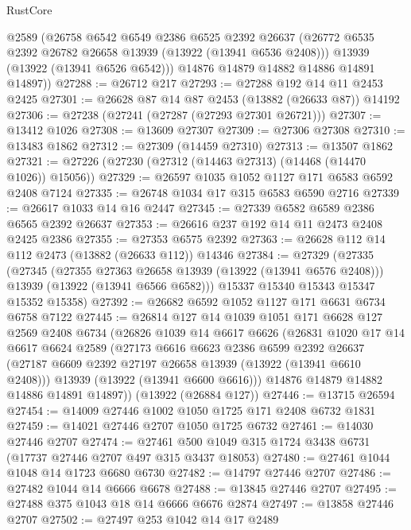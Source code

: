 \begin{lexlean}{RustCore}
\begin{coremodule}
        @2589
        (@26758
          @6542
          @6549
          @2386
          @6525
          @2392
          @26637
          (@26772 @6535 @2392 @26782 @26658 @13939 (@13922 (@13941 @6536 @2408)))
          @13939
          (@13922 (@13941 @6526 @6542)))
        @14876
        @14879
        @14882
        @14886
        @14891
        @14897))
@27288 := @26712 @217
@27293 := @27288 @192 @14 @11 @2453 @2425
@27301 := @26628 @87 @14 @87 @2453 (@13882 (@26633 @87)) @14192
@27306 := @27238 (@27241 (@27287 (@27293 @27301 @26721)))
@27307 := @13412 @1026
@27308 := @13609 @27307
@27309 := @27306 @27308
@27310 := @13483 @1862
@27312 := @27309 (@14459 @27310)
@27313 := @13507 @1862
@27321 := @27226 (@27230 (@27312 (@14463 @27313) (@14468 (@14470 @1026)) @15056))
@27329 := @26597 @1035 @1052 @1127 @171 @6583 @6592 @2408 @7124
@27335 := @26748 @1034 @17 @315 @6583 @6590 @2716
@27339 := @26617 @1033 @14 @16 @2447
@27345 := @27339 @6582 @6589 @2386 @6565 @2392 @26637
@27353 := @26616 @237 @192 @14 @11 @2473 @2408 @2425 @2386
@27355 := @27353 @6575 @2392
@27363 := @26628 @112 @14 @112 @2473 (@13882 (@26633 @112)) @14346
@27384 := @27329
    (@27335
      (@27345
        (@27355 @27363 @26658 @13939 (@13922 (@13941 @6576 @2408)))
        @13939
        (@13922 (@13941 @6566 @6582)))
      @15337
      @15340
      @15343
      @15347
      @15352
      @15358)
@27392 := @26682 @6592 @1052 @1127 @171 @6631 @6734 @6758 @7122
@27445 := @26814
    @127
    @14
    @1039
    @1051
    @171
    @6628
    @127
    @2569
    @2408
    @6734
    (@26826
      @1039
      @14
      @6617
      @6626
      (@26831
        @1020
        @17
        @14
        @6617
        @6624
        @2589
        (@27173
          @6616
          @6623
          @2386
          @6599
          @2392
          @26637
          (@27187 @6609 @2392 @27197 @26658 @13939 (@13922 (@13941 @6610 @2408)))
          @13939
          (@13922 (@13941 @6600 @6616)))
        @14876
        @14879
        @14882
        @14886
        @14891
        @14897))
    (@13922 (@26884 @127))
@27446 := @13715 @26594
@27454 := @14009 @27446 @1002 @1050 @1725 @171 @2408 @6732 @1831
@27459 := @14021 @27446 @2707 @1050 @1725 @6732
@27461 := @14030 @27446 @2707
@27474 := @27461 @500 @1049 @315 @1724 @3438 @6731 (@17737 @27446 @2707 @497 @315 @3437 @18053)
@27480 := @27461 @1044 @1048 @14 @1723 @6680 @6730
@27482 := @14797 @27446 @2707
@27486 := @27482 @1044 @14 @6666 @6678
@27488 := @13845 @27446 @2707
@27495 := @27488 @375 @1043 @18 @14 @6666 @6676 @2874
@27497 := @13858 @27446 @2707
@27502 := @27497 @253 @1042 @14 @17 @2489

\end{coremodule}
\end{lexlean}
